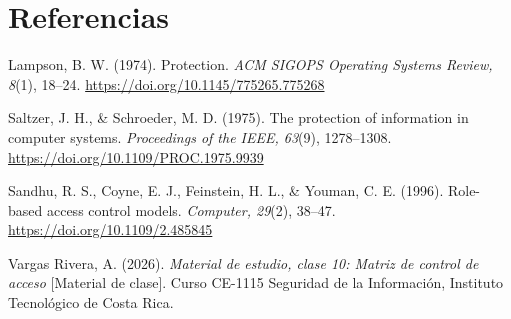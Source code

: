 \documentclass[11pt,letterpaper]{article}
\begin{document}
\section*{Referencias}

{\small
\setlength{\parskip}{0.5em}

Lampson, B. W. (1974). Protection. \emph{ACM SIGOPS Operating Systems Review, 8}(1), 18--24.
\url{https://doi.org/10.1145/775265.775268}

Saltzer, J. H., \& Schroeder, M. D. (1975). The protection of information in computer systems.
\emph{Proceedings of the IEEE, 63}(9), 1278--1308. \url{https://doi.org/10.1109/PROC.1975.9939}

Sandhu, R. S., Coyne, E. J., Feinstein, H. L., \& Youman, C. E. (1996). Role-based access control
models. \emph{Computer, 29}(2), 38--47. \url{https://doi.org/10.1109/2.485845}

Vargas Rivera, A. (2026). \emph{Material de estudio, clase 10: Matriz de control de acceso}
[Material de clase]. Curso CE-1115 Seguridad de la Información, Instituto Tecnológico de Costa Rica.

}
\end{document}
